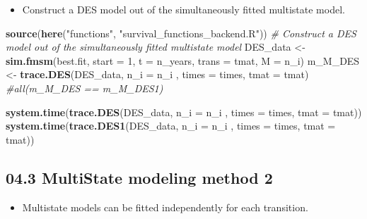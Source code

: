 \documentclass[
]{article}
\newenvironment{Shaded}{\begin{snugshade}}{\end{snugshade}}
\newcommand{\CommentTok}[1]{\textcolor[rgb]{0.56,0.35,0.01}{\textit{#1}}}
\newcommand{\DataTypeTok}[1]{\textcolor[rgb]{0.13,0.29,0.53}{#1}}
\newcommand{\DecValTok}[1]{\textcolor[rgb]{0.00,0.00,0.81}{#1}}
\newcommand{\KeywordTok}[1]{\textcolor[rgb]{0.13,0.29,0.53}{\textbf{#1}}}
\newcommand{\NormalTok}[1]{#1}
\newcommand{\StringTok}[1]{\textcolor[rgb]{0.31,0.60,0.02}{#1}}
\providecommand{\tightlist}{%
  \setlength{\itemsep}{0pt}\setlength{\parskip}{0pt}}
\begin{document}
\begin{itemize}
\tightlist
\item
  Construct a DES model out of the simultaneously fitted multistate
  model.
\end{itemize}

\begin{Shaded}
\begin{Highlighting}[]
\KeywordTok{source}\NormalTok{(}\KeywordTok{here}\NormalTok{(}\StringTok{"functions"}\NormalTok{, }\StringTok{"survival_functions_backend.R"}\NormalTok{))}
\CommentTok{# Construct a DES model out of the simultaneously fitted multistate model}
\NormalTok{DES_data <-}\StringTok{ }\KeywordTok{sim.fmsm}\NormalTok{(best.fit, }\DataTypeTok{start =} \DecValTok{1}\NormalTok{, }\DataTypeTok{t =}\NormalTok{ n_years, }\DataTypeTok{trans =}\NormalTok{ tmat, }\DataTypeTok{M =}\NormalTok{ n_i)}
\NormalTok{m_M_DES  <-}\StringTok{ }\KeywordTok{trace.DES}\NormalTok{(DES_data, }\DataTypeTok{n_i  =}\NormalTok{ n_i , }\DataTypeTok{times =}\NormalTok{ times, }\DataTypeTok{tmat =}\NormalTok{ tmat)}
\CommentTok{#all(m_M_DES == m_M_DES1)}
\end{Highlighting}
\end{Shaded}

\begin{Shaded}
\begin{Highlighting}[]
\KeywordTok{system.time}\NormalTok{(}\KeywordTok{trace.DES}\NormalTok{(DES_data, }\DataTypeTok{n_i  =}\NormalTok{ n_i , }\DataTypeTok{times =}\NormalTok{ times, }\DataTypeTok{tmat =}\NormalTok{ tmat))}
\KeywordTok{system.time}\NormalTok{(}\KeywordTok{trace.DES1}\NormalTok{(DES_data, }\DataTypeTok{n_i  =}\NormalTok{ n_i , }\DataTypeTok{times =}\NormalTok{ times, }\DataTypeTok{tmat =}\NormalTok{ tmat))}
\end{Highlighting}
\end{Shaded}

\hypertarget{multistate-modeling-method-2}{%
\subsection{04.3 MultiState modeling method
2}\label{multistate-modeling-method-2}}

\begin{itemize}
\tightlist
\item
  Multistate models can be fitted independently for each transition.
\end{itemize}
\end{document}
